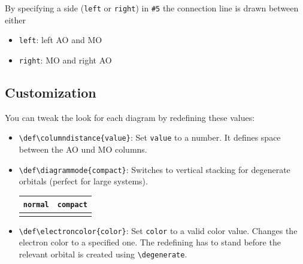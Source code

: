 \documentclass[12pt, a4paper]{article}
\begin{document}
By specifying a side (\texttt{left} or \texttt{right}) in \texttt{\#5} the connection line is drawn between either
\begin{itemize}
    \item \texttt{left}: left AO and MO
    \item \texttt{right}: MO and right AO
\end{itemize}

\subsection{Customization}
You can tweak the look for each diagram by redefining these values:

\begin{itemize}
    \item \texttt{\textbackslash def\textbackslash columndistance\{value\}}: Set \texttt{value} to a number. It defines space between the AO und MO columns.
    \item \texttt{\textbackslash def\textbackslash diagrammode\{compact\}}: Switches to vertical stacking for degenerate orbitals (perfect for large systems).
          \newcommand{\previewcompact}[1]{
              \begin{mohelper}[scale=0.6]
                  \def\diagrammode{#1}
                  \ifstrequal{#1}{compact}{\def\electroncolor{red}}{}
                  \overlapp{-0.5/{2s/pair},2/{2p/pair,2p/up,2p/up}}{-3/{$\sigma$/pair},6/{$\sigma^*$/leer},1/{/pair}}{3/{/pair,/leer}}%
                  \overlapp{2/{,,}}{4/{$\pi^*$/leer},-1/{$\pi$/pair}}{3/{,}}%
                  \overlapp{2/{,,}}{2/{/pair}}{}%
                  \addlabel{$\ce{O}$,$\ce{H2O}$,$\ce{H2}$}{0.5}
              \end{mohelper}
          }
          \begin{center}
              \begin{tabular}{|c c|}
                  \hline
                  \texttt{normal}                & \texttt{compact}         \\
                  \hline
                  \previewcompact{normal} \vline & \previewcompact{compact} \\
                  \hline
              \end{tabular}
          \end{center}
    \item \texttt{\textbackslash def\textbackslash electroncolor\{color\}}: Set \texttt{color} to a valid color value. Changes the electron color to a specified one. The redefining has to stand before the relevant orbital is created using \texttt{\textbackslash degenerate}.
\end{itemize}
\end{document}
